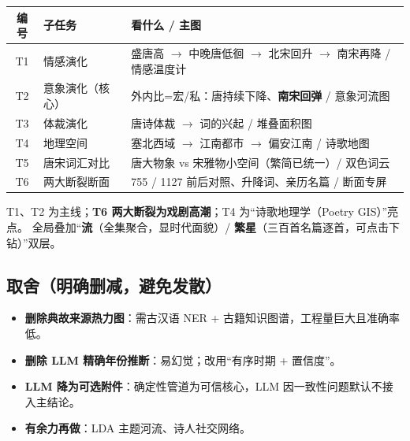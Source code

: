 \begin{table}[H]
\centering
\renewcommand{\arraystretch}{1.3}
\begin{tabular}{c l l}
\toprule
编号 & 子任务 & 看什么 / 主图 \\
\midrule
T1 & 情感演化 & 盛唐高 $\to$ 中晚唐低徊 $\to$ 北宋回升 $\to$ 南宋再降 / 情感温度计 \\
T2 & 意象演化（核心） & 外内比=宏/私：唐持续下降、\textbf{南宋回弹} / 意象河流图 \\
T3 & 体裁演化 & 唐诗体裁 $\to$ 词的兴起 / 堆叠面积图 \\
T4 & 地理空间 & 塞北西域 $\to$ 江南都市 $\to$ 偏安江南 / 诗歌地图 \\
T5 & 唐宋词汇对比 & 唐大物象 vs 宋雅物小空间（繁简已统一）/ 双色词云 \\
T6 & 两大断裂断面 & 755 / 1127 前后对照、升降词、亲历名篇 / 断面专屏 \\
\bottomrule
\end{tabular}
\end{table}

\noindent T1、T2 为主线；\textbf{T6 两大断裂为戏剧高潮}；T4 为“诗歌地理学（Poetry GIS）”亮点。
全局叠加“\textbf{流}（全集聚合，显时代面貌）/ \textbf{繁星}（三百首名篇逐首，可点击下钻）”双层。

\subsection{取舍（明确删减，避免发散）}

\begin{itemize}[leftmargin=*, itemsep=0.3em]
    \item \textbf{删除典故来源热力图}：需古汉语 NER + 古籍知识图谱，工程量巨大且准确率低。
    \item \textbf{删除 LLM 精确年份推断}：易幻觉；改用“有序时期 + 置信度”。
    \item \textbf{LLM 降为可选附件}：确定性管道为可信核心，LLM 因一致性问题默认不接入主结论。
    \item \textbf{有余力再做}：LDA 主题河流、诗人社交网络。
\end{itemize}
